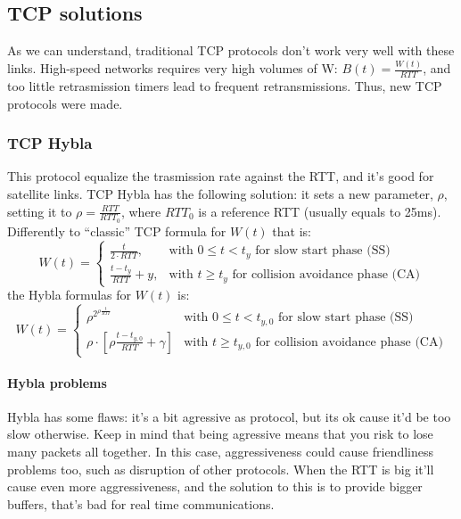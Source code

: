 \subsection{TCP solutions}

As we can understand, traditional TCP protocols don't work very well with these
links. High-speed networks requires very high volumes of W:
$B(t) = \frac{W(t)}{RTT}$, and too little retrasmission timers lead to frequent
retransmissions. Thus, new TCP protocols were made.

\subsubsection{TCP Hybla}
\label{prt:tcp:hybla}

This protocol equalize the trasmission rate against the RTT, and it's good for
satellite links.
TCP Hybla has the following solution: it sets a new parameter, $\rho$, setting
it to $\rho = \frac{RTT}{RTT_0}$, where $RTT_0$ is a reference RTT (usually
equals to 25ms).
Differently to ``classic'' TCP formula for $W(t)$ that is:
\begin{equation*}
  W(t) = \begin{cases}
    \frac{t}{2 \cdot RTT}, & \mbox{with } 0 \le t < t_y \mbox{ for slow start phase (SS)} \\
    \frac{t - t_y}{RTT} + y, & \mbox{with } t \ge t_y \mbox{ for collision avoidance phase (CA)}
  \end{cases}
\end{equation*}
the Hybla formulas for $W(t)$ is:
\begin{equation}
  W(t) = \begin{cases}
    \rho^{2^{\rho \frac{t}{RTT}}} & \mbox{with } 0 \le t < t_{y,0} \mbox{ for slow start phase (SS)} \\
    \rho \cdot \left [\rho\frac{t - t_{y,0}}{RTT} + \gamma \right ] & \mbox{with } t \ge t_{y,0} \mbox{ for collision avoidance phase (CA)}
    \end{cases}
\end{equation}

\paragraph*{Hybla problems} Hybla has some flaws: it's a bit agressive as
protocol, but its ok cause it'd be too slow otherwise. Keep in mind that being
agressive means that you risk to lose many packets all together. In this case,
aggressiveness could cause friendliness problems too, such as disruption of
other protocols.
When the RTT is big it'll cause even more aggressiveness, and the solution to
this is to provide bigger buffers, that's bad for real time communications.

